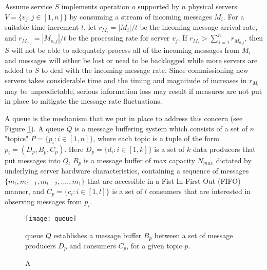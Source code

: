 Assume service $S$ implements operation $o$ supported by $n$ physical servers $V = \{v_j: j \in [1,n]\}$ by consuming a stream of incoming messages $M_i$. For a suitable time increment $t$, let $r_{M_i} = |M_i|/t$ be the incoming message arrival rate, and $r_{M_{o,j}} = |M_{o,j}|/t$ be the processing rate for server $v_j$. If $r_{M_i} > \sum_{j=1}^n r_{M_{o,j}}$, then $S$ will not be able to adequately process all of the incoming messages from $M_i$ and messages will either be lost or need to be backlogged while more servers are added to $S$ to deal with the incoming message rate. Since commissioning new servers takes considerable time and the timing and magnitude of increases in $r_{M_i}$ may be unpredictable, serious information loss may result if measures are not put in place to mitigate the message rate fluctuations. 

A queue is the mechanism that we put in place to address this concern (see Figure \ref{fig:queue}). A queue $Q$ is a message buffering system which consists of a set of $n$ "topics" $P = \{p_i: i \in [1,n]\}$, where each topic is a tuple of the form $p_i = (D_p,B_p,C_p)$. Here $D_p = \{d_i: i\in [1,k]\}$ is a set of $k$ data producers that put messages into $Q$, $B_p$ is a message buffer of max capacity $N_{max}$ dictated by underlying server hardware characteristics, containing a sequence of messages $\{m_t, m_{t-1},m_{t-2},....,m_1\}$ that are accessible in a Fist In First Out (FIFO) manner, and $C_p = \{c_i: i \in [1,l]\}$ is a set of $l$ consumers that are interested in observing messages from $p_i$.

\begin{figure}[H]
\texttt{[image: queue]}
\centering
\caption A queue $Q$ establishes a message buffer $B_p$ between a set of message producers $D_p$ and consumers $C_p$, for a given topic $p$.
\label{fig:queue}
\end{figure}

